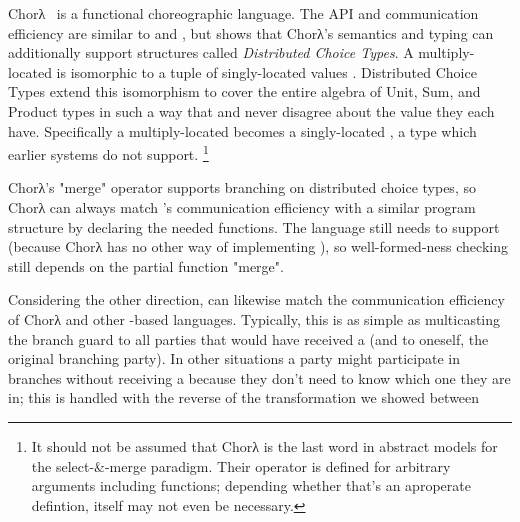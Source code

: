 Chorλ~\cite{chor-lambda} is a functional choreographic language.
The API and communication efficiency are similar to \cite{hirsch2021pirouette} and \cite{giallorenzo-choral},
but \cite{chor-lambda-2} shows that Chorλ's semantics and typing can additionally support structures called \emph{Distributed Choice Types}.
A multiply-located  is isomorphic to a tuple of singly-located values .
Distributed Choice Types extend this isomorphism to cover the entire algebra of Unit, Sum, and Product types
in such a way that  and  never disagree about the value they each have.
Specifically a multiply-located  becomes a singly-located ,
a type which earlier systems do not support.
\footnote{
  It should not be assumed that Chorλ is the last word in abstract models for the select-\&-merge paradigm.
  Their  operator is defined for arbitrary arguments including functions;
  depending whether that's an aproperate defintion,  itself may not even be necessary.
}

Chorλ's "merge" operator supports branching on distributed choice types,
so Chorλ can always match \HLSCentral's communication efficiency with a similar program structure
by declaring the needed  functions.
The language still needs to support 
(because Chorλ has no other way of implementing ),
so well-formed-ness checking still depends on the partial function "merge".

Considering the other direction, \HLSCentral can likewise match the communication efficiency of Chorλ
and other -based languages.
Typically, this is as simple as multicasting the branch guard to all parties that would have received a 
(and to oneself, the original branching party).
In other situations a party might participate in branches without receiving a 
because they don't need to know which one they are in;
this is handled with the reverse of the transformation we showed between 

